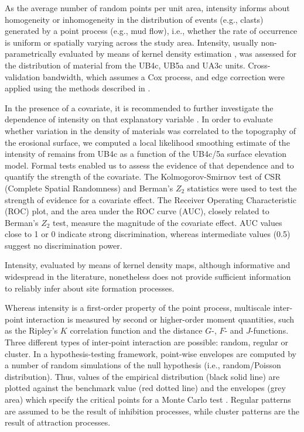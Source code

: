\documentclass[preprint,authoryear,times]{elsarticle} %
\begin{document}
As the average number of random points per unit area, intensity informs about homogeneity or inhomogeneity in the distribution of events (e.g., clasts) generated by a point process (e.g., mud flow), i.e., whether the rate of occurrence is uniform or spatially varying across the study area. Intensity, usually non-parametrically evaluated by means of kernel density estimation \citep{Diggle1985}, was assessed for the distribution of material from the UB4c, UB5a and UA3c units. Cross-validation bandwidth, which assumes a Cox process, and edge correction were applied using the methods described in \cite{Diggle1985}.

In the presence of a covariate, it is recommended to further investigate the dependence of intensity on that explanatory variable \citep{Baddeley2012}. In order to evaluate whether variation in the density of materials was correlated to the topography of the erosional surface, we computed a local likelihood smoothing estimate of the intensity of remains from UB4c as a function of the UB4c/5a surface elevation model. Formal tests enabled us to assess the evidence of that dependence and to quantify the strength of the covariate. The Kolmogorov-Smirnov test of CSR (Complete Spatial Randomness) and Berman's $Z_2$ statistics were used to test the strength of evidence for a covariate effect. The Receiver Operating Characteristic (ROC) plot, and the area under the ROC curve (AUC), closely related to Berman's $Z_2$ test, measure the magnitude of the covariate effect. AUC values close to 1 or 0 indicate strong discrimination, whereas intermediate values (0.5) suggest no discrimination power.

Intensity, evaluated by means of kernel density maps, although informative and widespread in the literature, nonetheless does not provide sufficient information to reliably infer about site formation processes.

Whereas intensity is a first-order property of the point process, multiscale inter-point interaction is measured by second or higher-order moment quantities, such as the Ripley's $K$ correlation function \citep{Ripley1976,Ripley1977} and the distance $G$-, $F$- and $J$-functions. Three different types of inter-point interaction are possible: random, regular or cluster. In a hypothesis-testing framework, point-wise envelopes are computed by a number of random simulations of the null hypothesis (i.e., random/Poisson distribution). Thus, values of the empirical distribution (black solid line) are plotted against the benchmark value (red dotted line) and the envelopes (grey area) which specify the critical points for a Monte Carlo test \citep{Ripley1981}. Regular patterns are assumed to be the result of inhibition processes, while cluster patterns are the result of attraction processes. %
\end{document}
